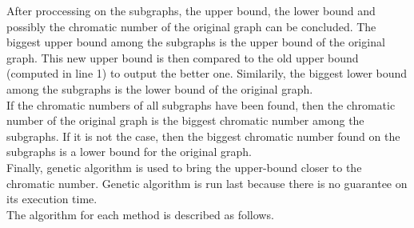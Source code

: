 \documentclass[a4paper]{report}
\begin{document}
	After proccessing on the subgraphs, the upper bound, the lower bound and possibly the chromatic number of the original graph can be concluded. The biggest upper bound among the subgraphs is the upper bound of the original graph. This new upper bound is then compared to the old upper bound (computed in line 1) to output the better one. Similarily, the biggest lower bound among the subgraphs is the lower bound of the original graph. \\
	If the chromatic numbers of all subgraphs have been found, then the chromatic number of the original graph is the biggest chromatic number among the subgraphs. If it is not the case, then the biggest chromatic number found on the subgraphs is a lower bound for the original graph.\\
	Finally, genetic algorithm is used to bring the upper-bound closer to the chromatic number. Genetic algorithm is run last because there is no guarantee on its execution time.\\
	The algorithm for each method is described as follows.
	
\end{document}
